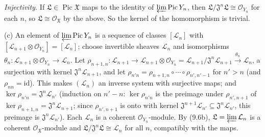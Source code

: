 \documentclass[11pt]{article}
\begin{document}
\emph{Injectivity.} If $\mathfrak L\in\operatorname{Pic}\mathfrak X$ maps to the identity of $\varprojlim\operatorname{Pic}Y_n$, then $\mathfrak L/\mathfrak J^n\mathfrak L\cong\mathcal O_{Y_n}$ for each $n$, so $\mathfrak L\cong\mathcal O_{\mathfrak X}$ by the above. So the kernel of the homomorphism is trivial.

(c) An element of $\varprojlim\operatorname{Pic}Y_n$ is a sequence of classes $[\mathcal L_n]$ with $[\mathcal L_{n+1}\otimes\mathcal O_{Y_n}]=[\mathcal L_n]$; choose invertible sheaves $\mathcal L_n$ and isomorphisms $\theta_n:\mathcal L_{n+1}\otimes\mathcal O_{Y_n}\to\mathcal L_n$. Let $\rho_{n+1,n}:\mathcal L_{n+1}\to\mathcal L_{n+1}\otimes\mathcal O_{Y_n}=\mathcal L_{n+1}/\mathfrak J^n\mathcal L_{n+1}\xrightarrow{\theta_n}\mathcal L_n$, a surjection with kernel $\mathfrak J^n\mathcal L_{n+1}$, and let $\rho_{n'n}=\rho_{n+1,n}\circ\cdots\circ\rho_{n',n'-1}$ for $n'>n$ (and $\rho_{nn}=\mathrm{id}$). This makes $(\mathcal L_n)$ an inverse system with surjective maps; and $\ker\rho_{n'n}=\mathfrak J^n\mathcal L_{n'}$ (induction on $n'-n$: $\ker\rho_{n'n}$ is the preimage under $\rho_{n',n+1}$ of $\ker\rho_{n+1,n}=\mathfrak J^n\mathcal L_{n+1}$; since $\rho_{n',n+1}$ is onto with kernel $\mathfrak J^{n+1}\mathcal L_{n'}\subseteq\mathfrak J^n\mathcal L_{n'}$, this preimage is $\mathfrak J^n\mathcal L_{n'}$). Each $\mathcal L_n$ is a coherent $\mathcal O_{Y_n}$-module. By (9.6b), $\mathfrak L=\varprojlim\mathcal L_n$ is a coherent $\mathcal O_{\mathfrak X}$-module and $\mathfrak L/\mathfrak J^n\mathfrak L\cong\mathcal L_n$ for all $n$, compatibly with the maps.
\end{document}
